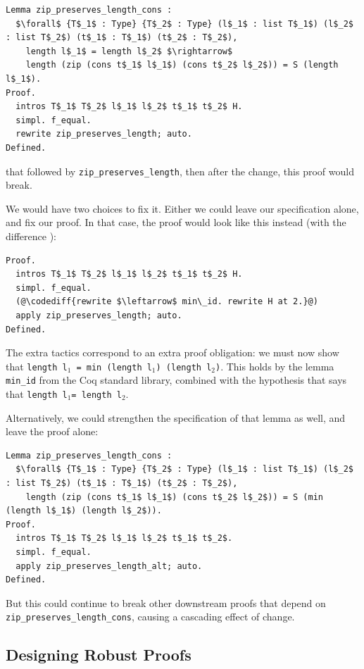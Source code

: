 \begin{lstlisting}
Lemma zip_preserves_length_cons :
  $\forall$ {T$_1$ : Type} {T$_2$ : Type} (l$_1$ : list T$_1$) (l$_2$ : list T$_2$) (t$_1$ : T$_1$) (t$_2$ : T$_2$),
    length l$_1$ = length l$_2$ $\rightarrow$
    length (zip (cons t$_1$ l$_1$) (cons t$_2$ l$_2$)) = S (length l$_1$).
Proof.
  intros T$_1$ T$_2$ l$_1$ l$_2$ t$_1$ t$_2$ H.
  simpl. f_equal.
  rewrite zip_preserves_length; auto.
Defined.
\end{lstlisting}
that followed by \lstinline{zip_preserves_length},
then after the change, this proof would break.

We would have two choices to fix it. Either we could leave our specification alone,
and fix our proof.
In that case,
the proof would look like this instead (with the difference ):

\begin{lstlisting}
Proof.
  intros T$_1$ T$_2$ l$_1$ l$_2$ t$_1$ t$_2$ H.
  simpl. f_equal.
  (@\codediff{rewrite $\leftarrow$ min\_id. rewrite H at 2.}@)
  apply zip_preserves_length; auto.
Defined.
\end{lstlisting}
The extra tactics correspond to an extra proof obligation:
we must now show that \lstinline{length l}$_1$\lstinline{ = min (length l}$_1$\lstinline{) (length l}$_2$\lstinline{)}.
This holds by the lemma \lstinline{min_id} from the Coq standard library, combined with the hypothesis that says that \lstinline{length l}$_1$\lstinline{= length l}$_2$.

Alternatively, we could strengthen the specification of that lemma as well, and leave the proof alone:

\begin{lstlisting}
Lemma zip_preserves_length_cons :
  $\forall$ {T$_1$ : Type} {T$_2$ : Type} (l$_1$ : list T$_1$) (l$_2$ : list T$_2$) (t$_1$ : T$_1$) (t$_2$ : T$_2$),
    length (zip (cons t$_1$ l$_1$) (cons t$_2$ l$_2$)) = S (min (length l$_1$) (length l$_2$)).
Proof.
  intros T$_1$ T$_2$ l$_1$ l$_2$ t$_1$ t$_2$.
  simpl. f_equal.
  apply zip_preserves_length_alt; auto.
Defined.
\end{lstlisting}
But this could continue to break other downstream proofs that depend on \lstinline{zip_preserves_length_cons},
causing a cascading effect of change.

\subsection{Designing Robust Proofs}
\label{sec:design-robust}

